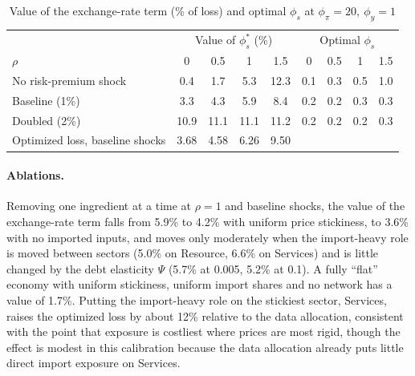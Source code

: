 \documentclass[12pt]{article}
\begin{document}
\begin{table}[H]
\centering\small
\caption{Value of the exchange-rate term (\% of loss) and optimal $\phi_s$ at $\phi_\pi=20,\ \phi_y=1$}
\label{tab:optrule}
\begin{tabular}{lcccc|cccc}
\toprule
 & \multicolumn{4}{c|}{Value of $\phi_s^*$ (\%)} & \multicolumn{4}{c}{Optimal $\phi_s$} \\
$\rho$ & 0 & 0.5 & 1 & 1.5 & 0 & 0.5 & 1 & 1.5 \\
\midrule
No risk-premium shock & 0.4 & 1.7 & 5.3 & 12.3 & 0.1 & 0.3 & 0.5 & 1.0 \\
Baseline (1\%) & 3.3 & 4.3 & 5.9 & 8.4 & 0.2 & 0.2 & 0.3 & 0.3 \\
Doubled (2\%) & 10.9 & 11.1 & 11.1 & 11.2 & 0.2 & 0.2 & 0.2 & 0.3 \\
\midrule
Optimized loss, baseline shocks & 3.68 & 4.58 & 6.26 & 9.50 & & & & \\
\bottomrule
\end{tabular}
\end{table}

\paragraph{Ablations.} Removing one ingredient at a time at $\rho=1$ and baseline shocks, the value of the
exchange-rate term falls from 5.9\% to 4.2\% with uniform price stickiness, to 3.6\% with no imported inputs, and
moves only moderately when the import-heavy role is moved between sectors (5.0\% on Resource, 6.6\% on Services) and is little changed by
the debt elasticity $\Psi$ (5.7\% at 0.005, 5.2\% at 0.1). A fully ``flat'' economy with uniform stickiness,
uniform import shares and no network has a value of 1.7\%. Putting the import-heavy role on the stickiest
sector, Services, raises the optimized loss by about 12\% relative to the data allocation, consistent with the
point that exposure is costliest where prices are most rigid, though the effect is modest in this calibration
because the data allocation already puts little direct import exposure on Services.
\end{document}
